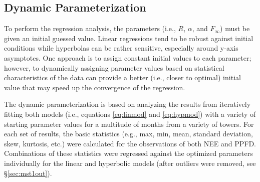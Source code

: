\subsection{Dynamic Parameterization}
\label{sec:mst1dyn}
To perform the regression analysis, the parameters (i.e., $R$, $\alpha$, and $F_\infty$) must be given an initial guessed value. 
Linear regressions tend to be robust against initial conditions while hyperbolas can be rather sensitive, especially around y-axis asymptotes.  
One approach is to assign constant initial values to each parameter; however, to dynamically assigning parameter values based on statistical characteristics of the data can provide a better (i.e., closer to optimal) initial value that may speed up the convergence of the regression. 

The dynamic parameterization is based on analyzing the results from iteratively fitting both models (i.e., equations \ref{eq:linmod} and \ref{eq:hypmod}) with a variety of starting parameter values for a multitude of months from a variety of towers.  
For each set of results, the basic statistics (e.g., max, min, mean, standard deviation, skew, kurtosis, etc.) were calculated for the observations of both NEE and PPFD.  
Combinations of these statistics were regressed against the optimized parameters individually for the linear and hyperbolic models (after outliers were removed, see \S \ref{sec:mst1out}).

